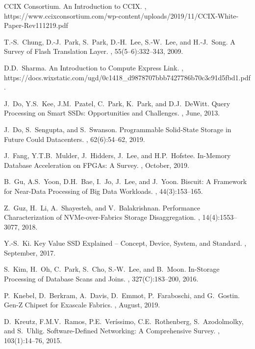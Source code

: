 \documentclass[11pt,dvipdfmx]{article}
\begin{document}
\begin{thebibliography}{10}
\begin{small}
 CCIX Consortium.
  \newblock An Introduction to CCIX.
  , https://www.ccixconsortium.com/wp-content/uploads/2019/11/CCIX-White-Paper-Rev111219.pdf

 T.-S.~Chung, D.-J.~Park, S.~Park, D.-H.~Lee, S.-W.~Lee, and H.-J.~Song.
  \newblock A Survey of Flash Translation Layer.
  , 55(5--6):332--343, 2009.

 D.D.~Sharma.
  \newblock An Introduction to Compute Express Link.
  , https://docs.wixstatic.com/ugd/0c1418\_d9878707bbb7427786b70c3c91d5fbd1.pdf.

 J.~Do, Y.S.~Kee, J.M.~Pzatel, C.~Park, K.~Park, and D.J.~DeWitt.
  \newblock Query Processing on Smart SSDs: Opportunities and Challenges.
  , June, 2013.

 J.~Do, S.~Sengupta, and S.~Swanson.
  \newblock Programmable Solid-State Storage in Future Could Datacenters.
  , 62(6):54--62, 2019.

 J.~Fang, Y.T.B.~Mulder, J.~Hidders, J.~Lee, and H.P.~Hofstee.
  \newblock In-Memory Database Acceleration on FPGAs: A Survey.
  , October, 2019.

 B.~Gu, A.S.~Yoon, D.H.~Bae, I.~Jo, J.~Lee, and J.~Yoon.
  \newblock Biscuit: A Framework for Near-Data Processing of Big Data Workloads.
  , 44(3):153--165.

 Z.~Guz, H.~Li, A.~Shayesteh, and V.~Balakrishnan.
  \newblock Performance Characterization of NVMe-over-Fabrics Storage Disaggregation.
  , 14(4):1553--3077, 2018.

 Y.-S.~Ki.
  \newblock Key Value SSD Explained – Concept, Device, System, and Standard.
  , September, 2017.

 S.~Kim, H.~Oh, C.~Park, S.~Cho, S.-W.~Lee, and B.~Moon.
  \newblock In-Storage Processing of Database Scans and Joins.
  , 327(C):183--200, 2016.

 P.~Knebel, D.~Berkram, A.~Davis, D.~Emmot, P.~Faraboschi, and G.~Gostin.
  \newblock Gen-Z Chipset for Exascale Fabrics.
  , August, 2019.

 D.~Kreutz, F.M.V.~Ramos, P.E.~Ver\'issimo, C.E.~Rothenberg, S.~Azodolmolky, and S.~Uhlig.
  \newblock Software-Defined Networking: A Comprehensive Survey.
  , 103(1):14--76, 2015.


\end{small}
\end{thebibliography}
\end{document}

